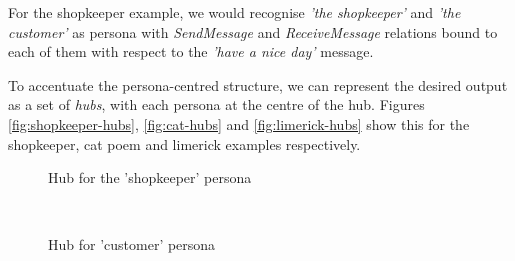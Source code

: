For the shopkeeper example, we would recognise \textit{'the shopkeeper'} and \textit{'the customer'} as persona with \textit{SendMessage} and \textit{ReceiveMessage} relations bound to each of them with respect to the \textit{'have a nice day'} message.

To accentuate the persona-centred structure, we can represent the desired output as a set of \textit{hubs}, with each persona at the centre of the hub. Figures \ref{fig:shopkeeper-hubs}, \ref{fig:cat-hubs} and \ref{fig:limerick-hubs} show this for the shopkeeper, cat poem and limerick examples respectively. 

\begin{figure*}[t!]
    \centering
    \begin{subfigure}[t]{0.45\textwidth}
        \caption{Hub for the 'shopkeeper' persona}
    \end{subfigure}%
    ~ 
    \begin{subfigure}[t]{0.45\textwidth}
        \caption{Hub for 'customer' persona}
    \end{subfigure}
    \caption{Persona hubs diagram for shopkeeper example}
    \label{fig:shopkeeper-hubs}
\end{figure*}


